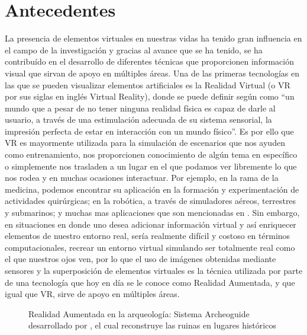 \documentclass[a4paper,openright,12pt]{report}
\begin{document}
\section{Antecedentes}
La presencia de elementos virtuales en nuestras vidas ha tenido gran influencia en el campo de la investigación y gracias al avance que se ha tenido, se ha contribuído en el desarrollo de diferentes técnicas que proporcionen información visual que sirvan de apoyo en múltiples áreas. Una de las primeras tecnologías en las que se pueden visualizar elementos artificiales es la Realidad Virtual (o VR por sus siglas en inglés Virtual Reality), donde se puede definir según \citep{coiffet1995} como ``un mundo que a pesar de no tener ninguna realidad física es capaz de darle al usuario, a través de una estimulación adecuada de su sistema sensorial, la impresión perfecta de estar en interacción con un mundo físico''. Es por ello que VR es mayormente utilizada para la simulación de escenarios que nos ayuden como entrenamiento, nos proporcionen conocimiento de algún tema en específico o simplemente nos trasladen a un lugar en el que podamos ver libremente lo que nos rodea y en muchas ocasiones interactuar. Por ejemplo, en la rama de la medicina, podemos encontrar su aplicación en la formación y experimentación de actividades quirúrgicas; en la robótica, a través de simuladores aéreos, terrestres y submarinos; y muchas mas aplicaciones que son mencionadas en \citep{levis1997}. Sin embargo, en situaciones en donde uno desea adicionar información virtual y así enriquecer elementos de nuestro entorno real, sería realmente difícil y costoso en términos computacionales, recrear un entorno virtual simulando ser totalmente real como el que nuestros ojos ven, por lo que el uso de imágenes obtenidas mediante sensores y la superposición de elementos virtuales es la técnica utilizada por parte de una tecnología que hoy en día se le conoce como Realidad Aumentada, y que igual que VR, sirve de apoyo en múltiples áreas.
\begin{figure}[th]
	\centering
	\caption[Realidad Aumentada en la arqueología]{Realidad Aumentada en la arqueología: Sistema Archeoguide desarrollado por \citep{vlahakis2002}, el cual reconstruye las ruinas en lugares históricos} \label{fig:arqueologia}
\end{figure}
\end{document}
